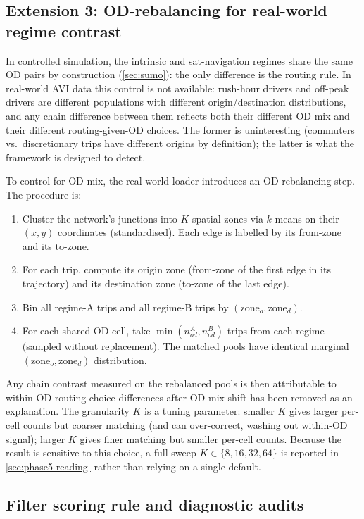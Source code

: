 \subsection{Extension 3: OD-rebalancing for real-world regime contrast}
\label{sec:od-rebal}

In controlled simulation, the intrinsic and sat-navigation regimes
share the same OD pairs by construction (\cref{sec:sumo}): the only
difference is the routing rule. In real-world AVI data this control is
not available: rush-hour drivers and off-peak drivers are
different populations with different origin/destination
distributions, and any chain difference between them reflects both
their different OD mix and their different routing-given-OD choices. The
former is uninteresting (commuters vs.\ discretionary trips have
different origins by definition); the latter is what the framework is
designed to detect.

To control for OD mix, the real-world loader introduces an OD-rebalancing
step. The procedure is:
\begin{enumerate}
\item Cluster the network's junctions into $K$ spatial zones via
$k$-means on their $(x, y)$ coordinates (standardised). Each edge is
labelled by its from-zone and its to-zone.
\item For each trip, compute its origin zone (from-zone of the first
edge in its trajectory) and its destination zone (to-zone of the last
edge).
\item Bin all regime-A trips and all regime-B trips by $(\text{zone}_o, \text{zone}_d)$.
\item For each shared OD cell, take $\min(n^A_{od}, n^B_{od})$ trips
from each regime (sampled without replacement). The matched pools
have identical marginal $(\text{zone}_o, \text{zone}_d)$ distribution.
\end{enumerate}
Any chain contrast measured on the rebalanced pools is then
attributable to within-OD routing-choice differences after OD-mix shift has
been removed as an explanation. The granularity $K$ is a tuning parameter:
smaller $K$
gives larger per-cell counts but coarser matching (and can
over-correct, washing out within-OD signal); larger $K$
gives finer matching but smaller per-cell counts. Because the result is
sensitive to this choice, a full sweep $K \in \{8, 16, 32, 64\}$ is
reported in \cref{sec:phase5-reading} rather than relying on a single
default.

\subsection{Filter scoring rule and diagnostic audits}
\label{sec:detector}

